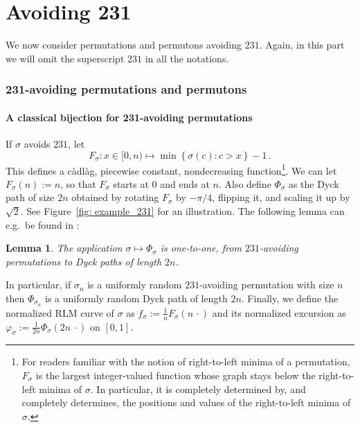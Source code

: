 \documentclass[a4paper,11pt]{amsart}
\newtheorem{lem}[thm]{Lemma}
\theoremstyle{definition}
\begin{document}
\part{Avoiding 231}
\label{part:231}

We now consider permutations and permutons avoiding $231$. 
Again, in this part we will omit the superscript $231$ in all the notations.


\section{231-avoiding permutations and permutons}
\label{sec:structure_231}

\subsection{A classical bijection for 231-avoiding permutations}
\label{ssec:bij231}

If $\sigma$ avoids $231$, let 
\[
    F_\sigma : x\in[0,n) \mapsto \min\left\{ \sigma(c) : c>x \right\} - 1 \,.
\]
This defines a càdlàg, piecewise constant, nondecreasing function\footnote{For readers familiar with the notion of right-to-left minima of a permutation, $F_\sigma$ is the largest integer-valued function whose graph stays below the right-to-left minima of $\sigma$.
In particular, it is completely determined by, and completely determines, the positions and values of the right-to-left minima of $\sigma$.}.
We can let $F_\sigma(n) := n$, so that $F_\sigma$ starts at $0$ and ends at $n$.
Also define $\Phi_\sigma$ as the Dyck path of size $2n$ obtained by rotating $F_\sigma$ by $-\pi/4$, flipping it, and scaling it up by $\sqrt 2$.
See Figure~\ref{fig: example_231} for an illustration.
The following lemma can e.g.~be found in \cite[Proof of Lemma 4.3]{BonaLivre}:
\begin{lem}
The application $\sigma \mapsto \Phi_\sigma$ is one-to-one, from $231$-avoiding permutations to Dyck paths of length $2n$.
\end{lem}
In particular, if $\sigma_n$ is a uniformly random $231$-avoiding permutation with size $n$ then $\Phi_{\sigma_n}$ is a uniformly random Dyck path of length $2n$.
Finally, we define the normalized RLM curve of $\sigma$ as $f_\sigma := \frac1n F_\sigma(n\,\cdot)$ 
and its normalized excursion as $\varphi_\sigma := \frac{1}{2n} \Phi_\sigma(2n\,\cdot)$ on $[0,1]$.
\end{document}

